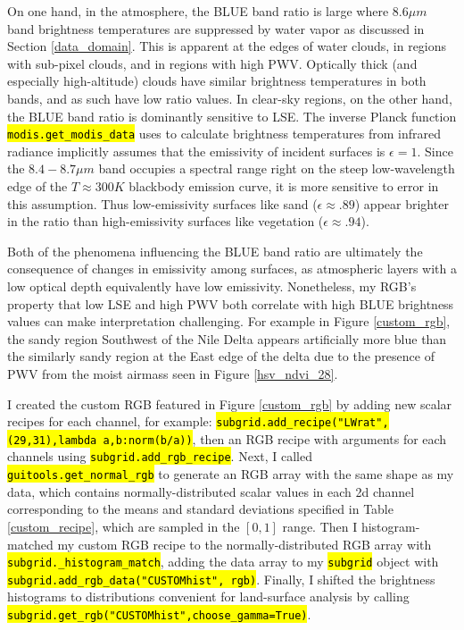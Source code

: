 \documentclass[12pt]{article}
\newcommand{\hltexttt}[1]{\texttt{\hl{#1}}}
\begin{document}
On one hand, in the atmosphere, the BLUE band ratio is large where $8.6\mu m$ band brightness temperatures are suppressed by water vapor as discussed in Section \ref{data_domain}. This is apparent at the edges of water clouds, in regions with sub-pixel clouds, and in regions with high PWV. Optically thick (and especially high-altitude) clouds have similar brightness temperatures in both bands, and as such have low ratio values. In clear-sky regions, on the other hand, the BLUE band ratio is dominantly sensitive to LSE. The inverse Planck function \hltexttt{modis.get\_modis\_data} uses to calculate brightness temperatures from infrared radiance implicitly assumes that the emissivity of incident surfaces is $\epsilon = 1$. Since the $8.4-8.7\mu m$ band occupies a spectral range right on the steep low-wavelength edge of the $T\approx 300K$ blackbody emission curve, it is more sensitive to error in this assumption. Thus low-emissivity surfaces like sand ($\epsilon \approx .89$) appear brighter in the ratio than high-emissivity surfaces like vegetation ($\epsilon \approx .94$).

Both of the phenomena influencing the BLUE band ratio are ultimately the consequence of changes in emissivity among surfaces, as atmospheric layers with a low optical depth equivalently have low emissivity. Nonetheless, my RGB's property that low LSE and high PWV both correlate with high BLUE brightness values can make interpretation challenging. For example in Figure \ref{custom_rgb}, the sandy region Southwest of the Nile Delta appears artificially more blue than the similarly sandy region at the East edge of the delta due to the presence of PWV from the moist airmass seen in Figure \ref{hsv_ndvi_28}.

I created the custom RGB featured in Figure \ref{custom_rgb} by adding new scalar recipes for each channel, for example: \hltexttt{subgrid.add\_recipe("LWrat",(29,31),lambda a,b:norm(b/a))}, then an RGB recipe with arguments for each channels using \hltexttt{subgrid.add\_rgb\_recipe}. Next, I called \hltexttt{guitools.get\_normal\_rgb} to generate an RGB array with the same shape as my data, which contains normally-distributed scalar values in each 2d channel corresponding to the means and standard deviations specified in Table \ref{custom_recipe}, which are sampled in the $[0,1]$ range. Then I histogram-matched my custom RGB recipe to the normally-distributed RGB array with \hltexttt{subgrid.\_histogram\_match}, adding the data array to my \hltexttt{subgrid} object with \hltexttt{subgrid.add\_rgb\_data("CUSTOMhist", rgb)}. Finally, I shifted the brightness histograms to distributions convenient for land-surface analysis by calling \hltexttt{subgrid.get\_rgb("CUSTOMhist",choose\_gamma=True)}.
\end{document}
